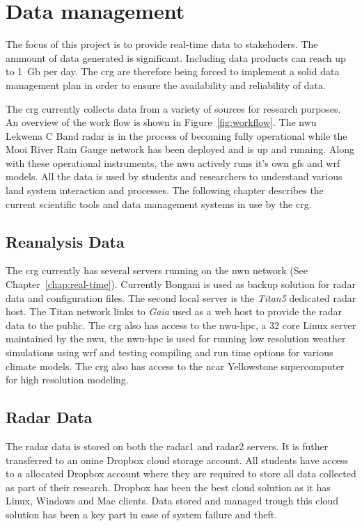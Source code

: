\documentclass{wrcreport}
\begin{document}
\section{Data management}

The focus of this project is to provide real-time data to stakehoders.
The ammount of data generated is significant. Including data products
can reach up to \SI{1}{Gb} per day. The \gls{crg} are therefore being
forced to implement a solid data management plan in order to ensure
the availability and reliability of data. 

The \gls{crg} currently collects data from a variety of sources for
research purposes. An overview of the work flow is shown in
Figure~\ref{fig:workflow}. The \gls{nwu} Lekwena C Band radar is in
the process of becoming fully operational while the Mooi River Rain
Gauge network has been deployed and is up and running. Along with
these operational instruments, the \gls{nwu} actively runs it's own
\gls{gfs} and \gls{wrf} models. All the data is used by students and
researchers to understand various land system interaction and
processes. The following chapter describes the current scientific
tools and data management systems in use by the \gls{crg}.

\subsection{Reanalysis Data} The \gls{crg} currently has several servers
running on the \gls{nwu} network (See Chapter~\ref{chap:real-time}).
Currently Bongani is used as backup solution for radar data and
configuration files. The second local server is the \textit{Titan5}
dedicated radar host. The Titan network links to \textit{Gaia} used as
a web host to provide the radar data to the public. The \gls{crg} also
has access to the \gls{nwu-hpc}, a 32 core Linux server maintained by
the \gls{nwu}, the \gls{nwu-hpc} is used for running low resolution
weather simulations using \gls{wrf} and testing compiling and run time
options for various climate models.  The \gls{crg} also has access to
the \gls{ncar} Yellowstone supercomputer for high resolution modeling.

\subsection{Radar Data} The radar data is stored on both the radar1 and
radar2 servers. It is futher transferred to an onine Dropbox cloud
storage account. All students have access to a allocated Dropbox
account where they are required to store all data collected as part of
their research. Dropbox has been the best cloud solution as it has
Linux, Windows and Mac clients. Data stored and managed trough this
cloud solution has been a key part in case of system failure and
theft.
\end{document}
